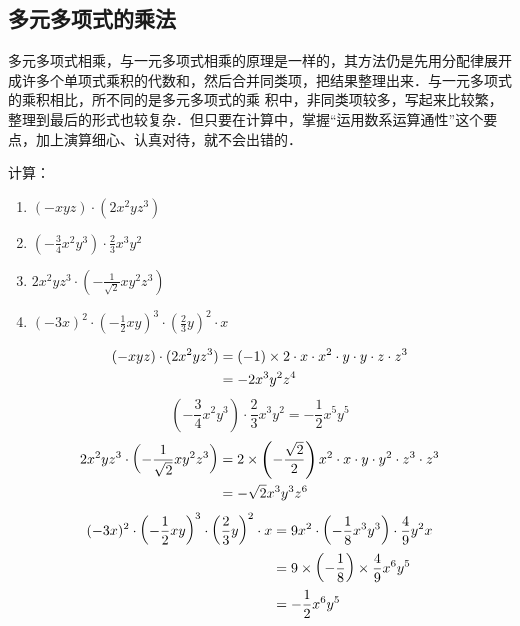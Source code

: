 \subsection{多元多项式的乘法}
多元多项式相乘，与一元多项式相乘的原理是一样的，其方法仍是先用分配律展开成许多个单项式乘积的代数和，然后合并同类项，把结果整理出来．与一元多项式的乘积相比，所不同的是多元多项式的乘
积中，非同类项较多，写起来比较繁，整理到最后的形式也较复杂．但只要在计算中，掌握“运用数系运算通性”这个要点，加上演算细心、认真对待，就不会出错的．

\begin{example}
    计算：
     \begin{multicols}{2}
\begin{enumerate}
    \item $(-xyz)\cdot (2x^2yz^3)$
    \item $\left(-\frac{3}{4}x^2y^3\right)\cdot \frac{2}{3}x^3y^2$
    \item $2x^2yz^3\cdot \left(-\frac{1}{\sqrt{2}}xy^2z^3\right)$
    \item $(-3x)^2\cdot \left(-\frac{1}{2}xy\right)^3\cdot \left(\frac{2}{3}y\right)^2\cdot x$
\end{enumerate}
\end{multicols}
\end{example}

\begin{solution}
\[\begin{split}
        (-xyz)\cdot (2x^2yz^3)&=(-1)\times 2\cdot x\cdot x^2\cdot y\cdot y\cdot z\cdot z^3\\
        &=-2x^3y^2z^4
    \end{split}\]
\[\left(-\frac{3}{4}x^2y^3\right)\cdot \frac{2}{3}x^3y^2=-\frac{1}{2}x^5y^5\]
 \[\begin{split}
       2x^2yz^3\cdot \left(-\dfrac{1}{\sqrt{2}}xy^2z^3\right)
&=2\times\left(-\dfrac{\sqrt{2}}{2}\right)x^2\cdot x\cdot y\cdot y^2\cdot z^3\cdot z^3\\
&=-\sqrt{2}x^3y^3z^6
    \end{split}\]
\[\begin{split}
       (-3x)^2\cdot \left(-\dfrac{1}{2}xy\right)^3\cdot \left(\dfrac{2}{3}y\right)^2\cdot x
        &=9x^2\cdot \left(-\dfrac{1}{8}x^3y^3\right)\cdot \dfrac{4}{9}y^2x\\
        &=9\times \left(-\dfrac{1}{8}\right)\times \dfrac{4}{9}x^6y^5\\
        &=-\dfrac{1}{2}x^6y^5
    \end{split}\]
\end{solution}

